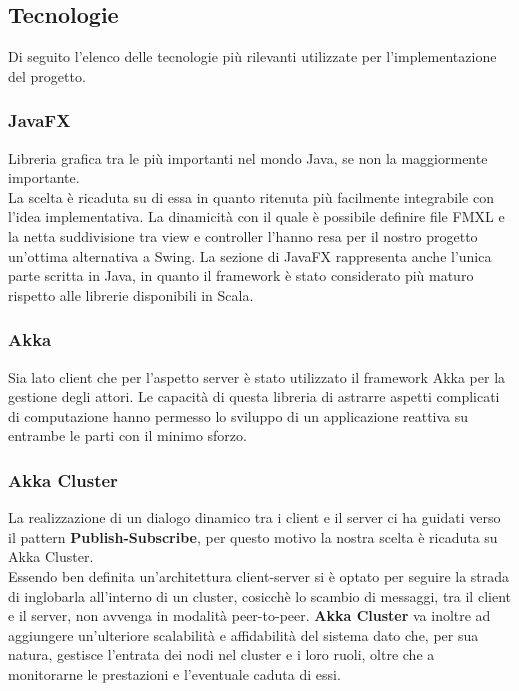             


        \subsection{Tecnologie}\label{subsec:technologies}
        Di seguito l'elenco delle tecnologie più rilevanti utilizzate per l'implementazione del progetto.
	  \subsubsection{JavaFX}\label{subsub:tecnologie:javafx}
	    Libreria grafica tra le più importanti nel mondo Java, se non la maggiormente importante. 
	    \\
	    La scelta è ricaduta su di essa in quanto ritenuta più facilmente integrabile con l'idea implementativa. 
	    La dinamicità con il quale è possibile definire file FMXL e la netta suddivisione tra view e controller l'hanno resa per il nostro progetto un'ottima alternativa a Swing.
	    La sezione di JavaFX rappresenta anche l'unica parte scritta in Java, in quanto il framework è stato considerato più maturo rispetto alle librerie disponibili in Scala.
	    
	 \subsubsection{Akka}\label{subsub:tecnologie:akka}
	   Sia lato client che per l'aspetto server è stato utilizzato il framework Akka per la gestione degli attori. 
	   Le capacità di questa libreria di astrarre aspetti complicati di computazione hanno permesso lo sviluppo di un applicazione reattiva su entrambe le parti con il minimo sforzo. 
	   
	 
	 \subsubsection{Akka Cluster}\label{subsub:tecnologie:akkacluster}
	   La realizzazione di un dialogo dinamico tra i client e il server ci ha guidati verso il pattern \textbf{Publish-Subscribe}, per questo motivo la nostra scelta è ricaduta su Akka Cluster. 
	   \\
	   Essendo ben definita un'architettura client-server si è optato per seguire la strada di inglobarla all'interno di un cluster, cosicchè lo scambio di messaggi, tra il client e il server, non avvenga in modalità peer-to-peer.
	   \textbf{Akka Cluster} va inoltre ad aggiungere un'ulteriore scalabilità e affidabilità del sistema dato che, per sua natura, gestisce l'entrata dei nodi nel cluster e i loro ruoli, oltre che a monitorarne le prestazioni e l'eventuale caduta di essi. 
